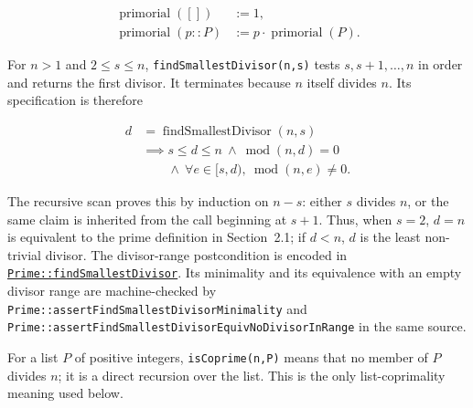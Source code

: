 \begin{equation*}
\begin{aligned}
\operatorname{primorial}([]) &:= 1, \\
\operatorname{primorial}(p::P) &:= p\cdot\operatorname{primorial}(P).
\end{aligned}
\end{equation*}

For $n>1$ and $2\leq s\leq n$, \texttt{findSmallestDivisor(n,s)} tests
$s,s+1,\ldots,n$ in order and returns the first divisor. It terminates
because $n$ itself divides $n$. Its specification is therefore

\begin{equation*}
\begin{aligned}
d &= \operatorname{findSmallestDivisor}(n,s) \\
&\implies s\leq d\leq n\ \land\ \operatorname{mod}(n,d)=0 \\
&\phantom{\implies}\land\ \forall e\in[s,d),\ \operatorname{mod}(n,e)\ne0.
\end{aligned}
\end{equation*}

The recursive scan proves this by induction on $n-s$: either $s$ divides
$n$, or the same claim is inherited from the call beginning at $s+1$.
Thus, when $s=2$, $d=n$ is equivalent to the prime definition in
Section~2.1; if $d<n$, $d$ is the least non-trivial divisor. The
divisor-range postcondition is encoded in
\href{https://github.com/thiagomata/prime-numbers/blob/euclid-theorem-article-v1.0.0/src/main/scala/v1/chapter5/prime/Prime.scala}{\texttt{Prime::findSmallestDivisor}}.
Its minimality and its equivalence with an empty divisor range are
machine-checked by \texttt{Prime::assertFindSmallestDivisorMinimality} and
\texttt{Prime::assertFindSmallestDivisorEquivNoDivisorInRange} in the same
source.

For a list $P$ of positive integers, \texttt{isCoprime(n,P)} means that no
member of $P$ divides $n$; it is a direct recursion over the list. This is
the only list-coprimality meaning used below.
